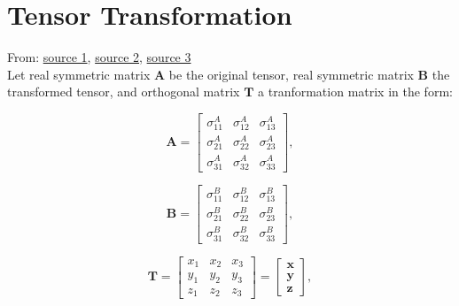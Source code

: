 \documentclass[10pt,b5paper,titlepage]{book}
\begin{document}
\section{Tensor Transformation}

From: \href{https://wp.optics.arizona.edu/optomech/wp-content/uploads/sites/53/2016/10/OPTI_222_W21.pdf}{source 1},
\href{https://www.continuummechanics.org/principalstressesandstrains.html}{source 2},
\href{https://www.ecourses.ou.edu/cgi-bin/eBook.cgi?doc=&topic=me&chap_sec=07.2&page=theory}{source 3} \\

Let real symmetric matrix  $\mathbf{A}$ be the original tensor,
real symmetric matrix $\mathbf{B}$ the transformed tensor, and
orthogonal matrix $\mathbf{T}$ a tranformation matrix in the form:

\begin{equation}
    \mathbf{A} = \begin{bmatrix}
        \sigma^{A}_{11} & \sigma^{A}_{12} & \sigma^{A}_{13} \\
        \sigma^{A}_{21} & \sigma^{A}_{22} & \sigma^{A}_{23} \\
        \sigma^{A}_{31} & \sigma^{A}_{32} & \sigma^{A}_{33}
    \end{bmatrix}
,\end{equation}

\begin{equation}
    \mathbf{B} = \begin{bmatrix}
        \sigma^{B}_{11} & \sigma^{B}_{12} & \sigma^{B}_{13} \\
        \sigma^{B}_{21} & \sigma^{B}_{22} & \sigma^{B}_{23} \\
        \sigma^{B}_{31} & \sigma^{B}_{32} & \sigma^{B}_{33}
    \end{bmatrix}
,\end{equation}

\begin{equation}
    \mathbf{T} = \begin{bmatrix}
        x_1 & x_2 & x_3 \\
        y_1 & y_2 & y_3 \\
        z_1 & z_2 & z_3
    \end{bmatrix} = \begin{bmatrix}
        \mathbf{x} \\
        \mathbf{y} \\
        \mathbf{z}
    \end{bmatrix}
,\end{equation}
\end{document}
